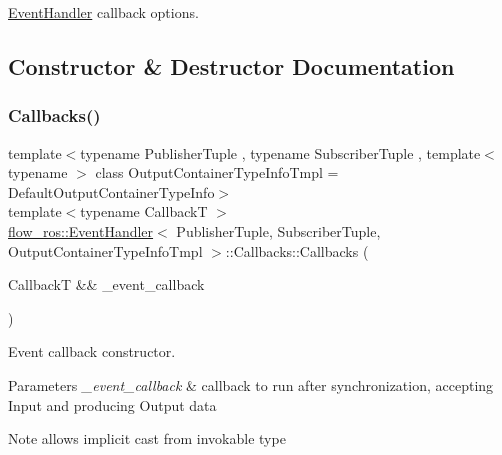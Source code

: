 \hyperlink{classflow__ros_1_1_event_handler}{Event\+Handler} callback options. 

\subsection{Constructor \& Destructor Documentation}
\mbox{\label{structflow__ros_1_1_event_handler_1_1_callbacks_ad939803306c7eba1e8ea6731f53f301c}} 
\subsubsection{\texorpdfstring{Callbacks()}{Callbacks()}\hspace{0.1cm}{\footnotesize\ttfamily [1/2]}}
{\footnotesize\ttfamily template$<$typename Publisher\+Tuple , typename Subscriber\+Tuple , template$<$ typename $>$ class Output\+Container\+Type\+Info\+Tmpl = Default\+Output\+Container\+Type\+Info$>$ \\
template$<$typename CallbackT $>$ \\
\hyperlink{classflow__ros_1_1_event_handler}{flow\+\_\+ros\+::\+Event\+Handler}$<$ Publisher\+Tuple, Subscriber\+Tuple, Output\+Container\+Type\+Info\+Tmpl $>$\+::Callbacks\+::\+Callbacks (\begin{DoxyParamCaption}\item[{CallbackT \&\&}]{\+\_\+event\+\_\+callback }\end{DoxyParamCaption})\hspace{0.3cm}{\ttfamily [inline]}}



Event callback constructor. 


\begin{DoxyParams}{Parameters}
{\em \+\_\+event\+\_\+callback} & callback to run after synchronization, accepting Input and producing Output data\\
\hline
\end{DoxyParams}
\begin{DoxyNote}{Note}
allows implicit cast from invokable type 
\end{DoxyNote}
\mbox{\label{structflow__ros_1_1_event_handler_1_1_callbacks_ae6a43604c27afa05e48153df03d96d2a}} 
